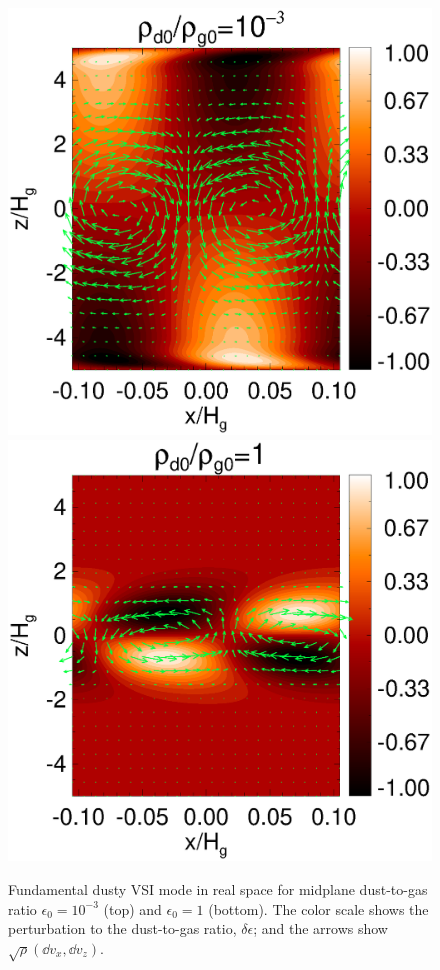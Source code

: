 \begin{figure}
  \includegraphics[scale=0.54, clip=true, trim=0cm 2.5cm 0cm 0cm]{figures/result2d_dg1d-3.ps}\\
  \includegraphics[scale=0.54]{figures/result2d_dg1.ps} 
  \caption{Fundamental dusty VSI mode in real space for midplane dust-to-gas
    ratio $\epsilon_0=10^{-3}$ (top) and $\epsilon_0=1$
    (bottom). The color scale shows the perturbation to the
    dust-to-gas ratio, $\delta\epsilon$; and the arrows show
    $\sqrt{\rho}\left(\dd v_x, \dd v_z\right)$. 
    \label{vsi_dust_loading2d}
    }
\end{figure}






